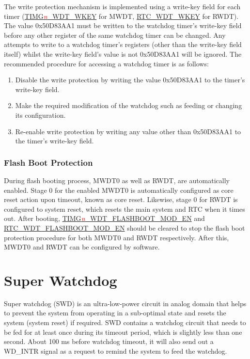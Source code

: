 \documentclass[main\_\_EN.tex]{subfiles}
\begin{document}
The write protection mechanism is implemented using a write-key field for each timer (\hyperref[fielddesc:TIMGWDTWKEY]{TIMG\textcolor{red}{\it{n}}\_WDT\_WKEY} for MWDT, \hyperref[fielddesc:RTCWDTWKEY]{RTC\_WDT\_WKEY} for RWDT). The value 0x50D83AA1 must be written to the watchdog timer's write-key field before any other register of the same watchdog timer can be changed. Any attempts to write to a watchdog timer's registers (other than the write-key field itself) whilst the write-key field's value is not 0x50D83AA1 will be ignored. The recommended procedure for accessing a watchdog timer is as follows:

\begin{enumerate}
\item Disable the write protection by writing the value 0x50D83AA1 to the timer's write-key field.
\item Make the required modification of the watchdog such as feeding or changing its configuration.
\item Re-enable write protection by writing any value other than 0x50D83AA1 to the timer's write-key field.
\end{enumerate}

\subsubsection{Flash Boot Protection}
During flash booting process, MWDT0 as well as RWDT, are automatically enabled. Stage 0 for the enabled MWDT0 is automatically configured as core reset action upon timeout, known as core reset. Likewise, stage 0 for RWDT is configured to system reset, which resets the main system and RTC when it times out. After booting, \hyperref[fielddesc:TIMGWDTFLASHBOOTMODEN]{TIMG\textcolor{red}{\it{n}}\_WDT\_FLASHBOOT\_MOD\_EN} and \hyperref[fielddesc:RTCWDTFLASHBOOTMODEN]{RTC\_WDT\_FLASHBOOT\_MOD\_EN}  should be cleared to stop the flash boot protection procedure for both MWDT0 and RWDT respectively. After this, MWDT0 and RWDT can be configured by software.


\section{Super Watchdog}\label{sec:wdt-swdt}
Super watchdog (SWD) is an ultra-low-power circuit in analog domain that helps to prevent the system from operating in a sub-optimal state and resets the system (system reset) if required. SWD contains a watchdog circuit that needs to be fed for at least once during its timeout period, which is slightly less than one second. About 100 ms before watchdog timeout, it will also send out a WD\_INTR signal as a request to remind the system to feed the watchdog.
\end{document}
